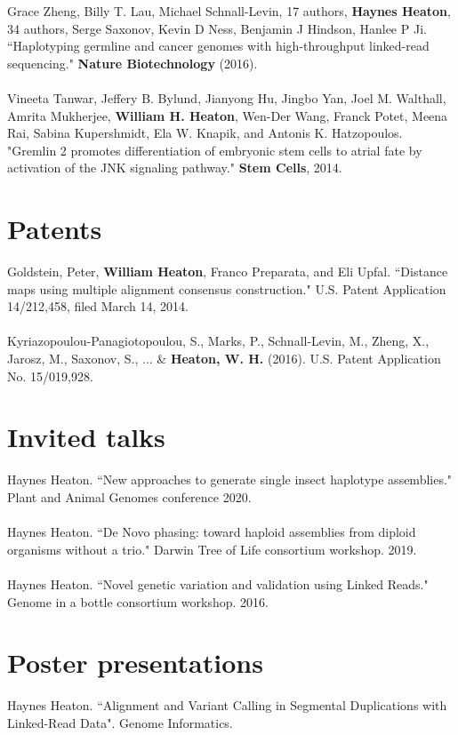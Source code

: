 \documentclass[10pt]{res}
\begin{document}
\begin{resume}
Grace Zheng, Billy T. Lau, Michael Schnall-Levin, 17 authors,  \textbf{Haynes Heaton}, 34 authors, Serge Saxonov, Kevin D Ness, Benjamin J Hindson, Hanlee P Ji. ``Haplotyping germline and cancer genomes with high-throughput linked-read sequencing." \textbf{Nature Biotechnology} (2016).  
\\ \\
Vineeta Tanwar, Jeffery B. Bylund, Jianyong Hu, Jingbo Yan, Joel M. Walthall, Amrita Mukherjee, \textbf{William H. Heaton}, Wen-Der Wang, Franck Potet, Meena Rai, Sabina Kupershmidt, Ela W. Knapik, and Antonis K. Hatzopoulos. "Gremlin 2 promotes differentiation of embryonic stem cells to atrial fate by activation of the JNK signaling pathway." \textbf{Stem Cells}, 2014. 

\section{Patents}
Goldstein, Peter, \textbf{William Heaton}, Franco Preparata, and Eli Upfal. ``Distance maps using multiple alignment consensus construction." U.S. Patent Application 14/212,458, filed March 14, 2014. \\  \\
Kyriazopoulou-Panagiotopoulou, S., Marks, P., Schnall-Levin, M., Zheng, X., Jarosz, M., Saxonov, S., ... \& \textbf{Heaton, W. H.} (2016). U.S. Patent Application No. 15/019,928. 


\section{Invited talks}
Haynes Heaton. ``New approaches to generate single insect haplotype assemblies." Plant and Animal Genomes conference 2020. \\ \\ 
Haynes Heaton. ``De Novo phasing: toward haploid assemblies from diploid organisms without a trio." Darwin Tree of Life consortium workshop. 2019. \\ \\
Haynes Heaton. ``Novel genetic variation and validation using Linked Reads." Genome in a bottle consortium workshop. 2016.

\section{Poster presentations}
Haynes Heaton. ``Alignment and Variant Calling in Segmental Duplications with Linked-Read Data". Genome Informatics. 



\end{resume}
\end{document}

